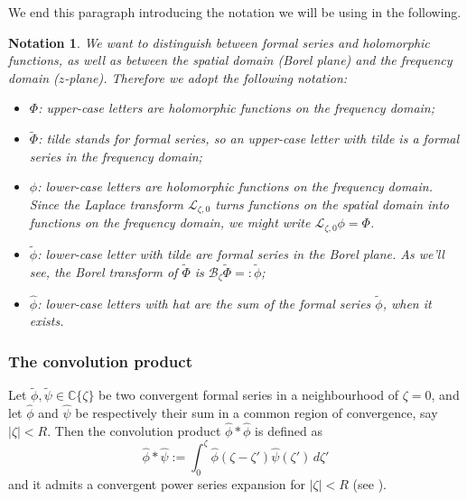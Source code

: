 \documentclass{article}
\newcommand{\C}{\mathbb{C}}
\newcommand{\series}[1]{\tilde{#1}}
\newcommand{\laplace}{\mathcal{L}}
\newcommand{\borel}{\mathcal{B}}
\theoremstyle{definition}
\theoremstyle{plain}
\newtheorem*{notation*}{Notation}
\begin{document}
We end this paragraph introducing the notation we will be using in the following. 
\begin{notation*}
We want to distinguish between formal series and holomorphic functions, as well as between the spatial domain (Borel plane) and the frequency domain ($z$-plane). Therefore we adopt the following notation:
\begin{itemize}
\item $\Phi$: upper-case letters are holomorphic functions on the frequency domain;
\item $\tilde{\Phi}$: \textit{tilde} stands for formal series, so an upper-case letter with \textit{tilde} is a formal series in the frequency domain;
\item $\phi$: lower-case letters are holomorphic functions on the frequency domain. Since the Laplace transform $\laplace_{\zeta, 0}$ turns functions on the spatial domain into functions on the frequency domain, we might write $\laplace_{\zeta,0}\phi=\Phi$.
\item $\tilde{\phi}$: lower-case letter with \textit{tilde} are formal series in the Borel plane. As we’ll see, the Borel transform of $\tilde{\Phi}$ is $\borel_\zeta \tilde{\Phi}=:\tilde{\phi}$; 
\item $\hat{\phi}$: lower-case letters with \textit{hat} are the sum of the formal series $\tilde{\phi}$, when it exists.  
\end{itemize}
\end{notation*}  

\subsubsection{The convolution product}\label{convolution}
%
Let $\series{\phi},\series{\psi}\in\C\lbrace\zeta\rbrace$ be two convergent formal series in a neighbourhood of $\zeta=0$, and let $\hat{\phi}$ and $\hat{\psi}$ be respectively their sum in a common region of convergence, say $|\zeta|<R$. Then the convolution product $\hat{\phi}\ast\hat{\phi}$ is defined as
\begin{equation}\label{eq:convolution}
    \hat{\phi}\ast\hat{\psi}:=\int_0^{\zeta}\hat{\phi}(\zeta-\zeta')\hat{\psi}(\zeta')\, d\zeta'
\end{equation}
and it admits a convergent power series expansion for $|\zeta|<R$ (see \cite[Lemma 5.14]{diverg-resurg-i}).
\end{document}

